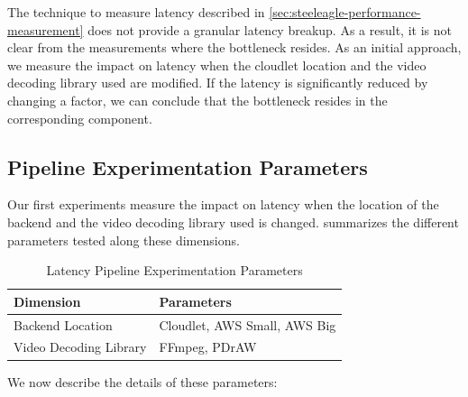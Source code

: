 The technique to measure latency described in
\cref{sec:steeleagle-performance-measurement} does not provide a granular
latency breakup. As a result, it is not clear from the measurements where the
bottleneck resides. As an initial approach, we measure the impact on latency
when the cloudlet location and the video decoding library used are modified. If
the latency is significantly reduced by changing a factor, we can conclude that
the bottleneck resides in the corresponding component.

\subsection{Pipeline Experimentation Parameters}

Our first experiments measure the impact on latency when the location of the
backend and the video decoding library used is changed. 
summarizes the different parameters tested along these dimensions.
\begin{table}[htbp]
    \centering
    \caption{Latency Pipeline Experimentation Parameters}
    \label{tab:experiment-parameters}
    \begin{tabular}{@{}ll@{}}
        \toprule
        \textbf{Dimension} & \textbf{Parameters} \\ \midrule
        Backend Location & Cloudlet, AWS Small, AWS Big \\
        Video Decoding Library & FFmpeg, PDrAW \\ \bottomrule
    \end{tabular}
\end{table}

We now describe the details of these parameters:

